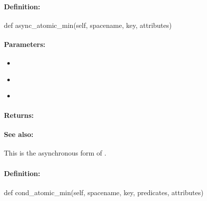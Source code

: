 \paragraph{Definition:}
\begin{pythoncode}
def async_atomic_min(self, spacename, key, attributes)
\end{pythoncode}

\paragraph{Parameters:}
\begin{itemize}[noitemsep]
\item {}\\

\item {}\\

\item {}\\

\end{itemize}

\paragraph{Returns:}


\paragraph{See also:}  This is the asynchronous form of .

\pagebreak
\subsubsection{}
\label{api:python:cond_atomic_min}


\paragraph{Definition:}
\begin{pythoncode}
def cond_atomic_min(self, spacename, key, predicates, attributes)
\end{pythoncode}

